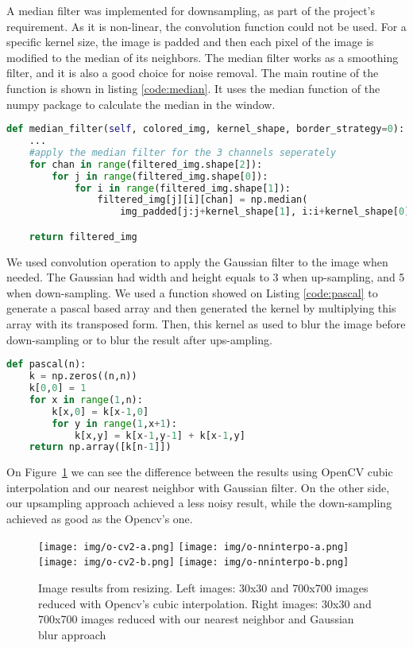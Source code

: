 \documentclass[]{IEEEtran}
\begin{document}
 A median filter was implemented for downsampling, as part of the project's requirement. As it is non-linear, the convolution function could not be used. For a specific kernel size, the image is padded and then each pixel of the image is modified to the median of its neighbors. The median filter works as a smoothing filter, and it is also a good choice for noise removal.
 The main routine of the function is shown in listing \ref{code:median}. It uses the median function of the numpy package to calculate the median in the window.
 
  \begin{lstlisting}[language=Python, caption={Main routine of median filter function}, label={code:median}]
def median_filter(self, colored_img, kernel_shape, border_strategy=0):    
    ...
    #apply the median filter for the 3 channels seperately
    for chan in range(filtered_img.shape[2]):
        for j in range(filtered_img.shape[0]):
            for i in range(filtered_img.shape[1]):
                filtered_img[j][i][chan] = np.median(
                    img_padded[j:j+kernel_shape[1], i:i+kernel_shape[0], chan])

    return filtered_img
\end{lstlisting}
 
 We used convolution operation to apply the Gaussian filter to the image when needed. The Gaussian had width and height equals to 3 when up-sampling, and 5 when down-sampling. We used a function showed on Listing \ref{code:pascal} to generate a pascal based array and then generated the kernel by multiplying this array with its transposed form. Then, this kernel as used to blur the image before down-sampling or to blur the result after ups-ampling.
 \begin{lstlisting}[language=Python, caption={Pascal array generator to generate Gaussian masks}, label={code:pascal}]
def pascal(n):
    k = np.zeros((n,n))
    k[0,0] = 1
    for x in range(1,n):
        k[x,0] = k[x-1,0]
        for y in range(1,x+1):
            k[x,y] = k[x-1,y-1] + k[x-1,y]
    return np.array([k[n-1]])
\end{lstlisting}
On Figure~\ref{fig:resize-compare} we can see the difference between the results using OpenCV cubic interpolation and our nearest neighbor with Gaussian filter. On the other side, our upsampling approach achieved a less noisy result, while the down-sampling achieved as good as the Opencv's one.

\begin{figure}[H]
    \centering
    \texttt{[image: img/o-cv2-a.png]}
    \texttt{[image: img/o-nninterpo-a.png]}
    \texttt{[image: img/o-cv2-b.png]}
    \texttt{[image: img/o-nninterpo-b.png]}
    \caption{Image results from resizing. Left images: 30x30 and 700x700 images reduced with Opencv's cubic interpolation. Right images: 30x30 and 700x700 images reduced with our nearest neighbor and Gaussian blur approach}
    \label{fig:resize-compare}
\end{figure}
\end{document}
